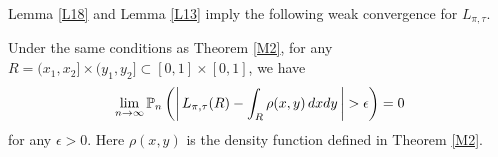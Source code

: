 
Lemma \ref{L18} and Lemma \ref{L13} imply the following weak convergence for $L_{\pi,\tau}$.

\begin{lemma}\label{L100}
Under the same conditions as Theorem \ref{M2}, for any $R = (x_1, x_2]\times (y_1, y_2] \subset [0, 1]\times [0, 1]$, we have
\begin{equation}
\lim_{n \to \infty} \mathbb{P}_n \left(\left|\,L_{\pi, \tau}(R) - \int_{R} \rho(x, y)\, dxdy\, \right| > \epsilon \right) = 0   \label{eq:L100a}
\end{equation}
for any $\epsilon > 0$. Here $\rho(x, y)$ is the density function defined in Theorem \ref{M2}.
\end{lemma}

